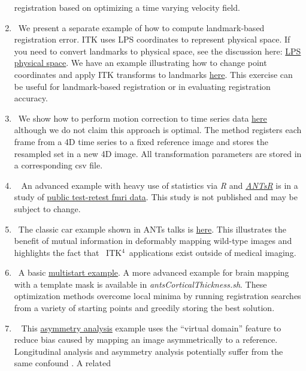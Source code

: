 \documentclass{frontiersSCNS}
\newcommand{\tk}{~ITK$^{\text{4}}$~}
\begin{document}
\begin{enumerate}
     registration based on optimizing a time
     varying velocity field.
  \item~We present a separate example of how to compute landmark-based
    registration error.  ITK uses LPS coordinates to represent physical space.  If you
    need to convert landmarks to physical space, see the discussion here:
    \href{http://sourceforge.net/p/advants/discussion/840261/thread/2a1e9307/}{LPS
      physical
      space}.  We have an example illustrating how to change point
    coordinates and apply ITK transforms to landmarks
    \href{http://stnava.github.io/chicken/}{here}.  This exercise can
    be useful for landmark-based registration or in evaluating
    registration accuracy.
  \item~We show how to perform motion correction to time series data
    \href{https://github.com/stnava/ANTs/blob/master/Scripts/antsMotionCorrExample}{here}
    although we do not claim this approach is optimal.  The method
    registers each frame from a 4D time series to a fixed reference
    image and stores the resampled set in a new 4D image.  All
    transformation parameters are stored in a corresponding csv file.
   \item~ An advanced example with heavy use of statistics via \textit{R} and \href{http://stnava.github.io/ANTsR/}{\textit{ANTsR}} is in
     a study of \href{http://stnava.github.io/RfMRI/}{public
       test-retest fmri data}.  This study is not published and may be
      subject to change.
  \item~The classic car example shown in ANTs talks is
    \href{http://stnava.github.io/cars/}{here}.  This illustrates the
    benefit of mutual information in deformably mapping wild-type
    images and highlights the fact that \tk applications exist outside
    of medical imaging.
  \item~A basic \href{http://stnava.github.io/butterfly/}{multistart example}.  A more advanced
    example for brain mapping with a template mask is available in
    \textit{antsCorticalThickness.sh}.  These optimization methods
    overcome local minima by running registration searches from a
    variety of starting points and greedily storing the best solution.
   \item~  This \href{http://stnava.github.io/asymmetry/}{asymmetry
       analysis} example uses the ``virtual domain'' feature to reduce
     bias caused by mapping an image asymmetrically to a reference.
     Longitudinal analysis and asymmetry analysis potentially suffer
     from the same confound \cite{Yushkevich2010a}.  A related

\end{enumerate}
\end{document}
